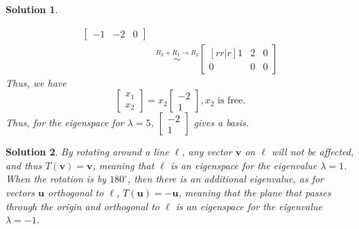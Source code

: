 \documentclass[11pt]{scrartcl}
\theoremstyle{dotlessP}
\newtheorem{sol}{Solution}[section]
\theoremstyle{dotlessN}
\newcommand{\degree}{^\circ}
\begin{document}
\begin{sol}
\begin{itemize}
\begin{align*}
\begin{bmatrix}
			-1 & -2 & 0 
		\end{bmatrix} \\
		&\stackrel{R_2 + R_1 \to R_2}{\sim}
		\begin{bmatrix}[rr|r]
			1 & 2 & 0 \\
			0 & 0 & 0
		\end{bmatrix}
	\end{align*}
	Thus, we have
	\[
	\begin{bmatrix}
	x_1 \\
	x_2
	\end{bmatrix} = 
	x_2
	\begin{bmatrix}
-2 \\
1
\end{bmatrix},  x_2 \text{ is free.}
	\] 
	Thus, for the eigenspace for $\lambda = 5$, $
	\begin{bmatrix}
		-2 \\
		1
	\end{bmatrix}
	$ gives a basis.
	\end{itemize}
\end{sol}
\begin{sol}
	By rotating around a line $\ell$, any vector $\bm{v}$ on $\ell$ will not be affected, and thus $T(\bm{v}) = \bm{v}$, meaning that $\ell$ is an eigenspace for the eigenvalue $\lambda = 1$. When the rotation is by $180\degree$, then there is an additional eigenvalue, as for vectors $\bm{u}$ orthogonal to $\ell$, $T(\bm{u}) = -\bm{u}$, meaning that the plane that passes through the origin and orthogonal to $\ell$ is an eigenspace for the eigenvalue $\lambda = -1$.
\end{sol}
\end{document}
